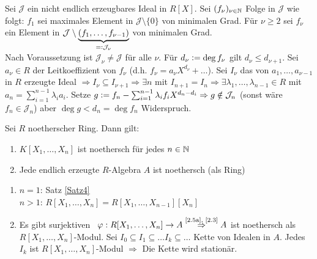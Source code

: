 \documentclass[a4paper, 10pt]{report}
\begin{document}
\begin{Bew} 
  Sei $\mathcal{J}$ ein nicht endlich erzeugbares Ideal in $R[X]$.
  Sei $(f_{\nu})_{\nu \in \mathbb{N}}$ Folge in $\mathcal{J}$ wie folgt:
  $f_1$ sei maximales Element in $\mathcal{J} \setminus \{0\}$ von minimalen
  Grad. Für $\nu \ge 2$ sei $f_{\nu}$ ein Element in $\mathcal{J} \setminus
  \underset{=\mathrel{\mathop:} \mathcal{J}_{\nu}}{\underbrace{(f_1, \dots , f_{\nu - 1})}}$
  von minimalen Grad.\\
  Nach Voraussetzung ist $\mathcal{J}_{\nu} \not= \mathcal{J}$ für alle $\nu$.
  Für $d_{\nu} \mathrel{\mathop:}= \deg{f_{\nu}}$ gilt $d_{\nu} \le d_{\nu + 1}$.
  Sei $a_{\nu} \in R$ der Leitkoeffizient von $f_{\nu}$ (d.h. $f_{\nu} =
  a_{\nu} X^{d_{\nu}} + \dots$). Sei $I_{\nu}$ das von $a_1, \dots , a_{\nu -1}$
  in $R$ erzeugte Ideal $\Rightarrow I_{\nu} \subseteq I_{\nu + 1} \Rightarrow
  \exists n$ mit $I_{n+1} = I_n \Rightarrow \exists \lambda_1, \dots ,
  \lambda_{n-1} \in R$ mit $a_n = \sum_{i=1}^{n-1} \lambda_i a_i$.
  Setze $g \mathrel{\mathop:}= f_n - \sum_{i=1}^{n-1} \lambda_i f_i X^{d_n - d_i}
  \Rightarrow g \notin \mathcal{J}_n$ (sonst wäre $f_n \in \mathcal{J}_n$) aber
  $\deg{g} < d_n = \deg{f_n}$ Widerspruch.
\end{Bew}

\begin{Folg} 
  Sei $R$ noetherscher Ring. Dann gilt:
  \begin{enumerate}
    \item \label{2.5a} $K[X_1, \dots , X_n]$ ist noethersch für jedes $n \in
    \mathbb{N}$
    \item Jede endlich erzeugte $R$-Algebra $A$ ist noethersch (als Ring)
  \end{enumerate}
\end{Folg}

\begin{Bew} 
  \begin{enumerate} 
    \item $n=1$: Satz \ref{Satz4}\\
          $n>1$: $R[X_1, \dots , X_n] = R[X_1, \dots , X_{n-1}][X_n]$
    \item Es gibt surjektiven \RAlgHom\ $\varphi: R[X_1, \dots
          , X_n] \to A \overset{\text{\scriptsize \ref{2.5a},
          \ref{2.3}}}{\Rightarrow} A$ ist noethersch als $R[X_1, \dots ,
          X_n]$-Modul. Sei $I_0 \subseteq I_1 \subseteq \dots I_k \subseteq
          \dots$ Kette von Idealen in $A$. Jedes $I_k$ ist $R[X_1, \dots ,
          X_n]$-Modul $\Rightarrow$ Die Kette wird stationär.
\end{enumerate}
\end{Bew}
\end{document}
